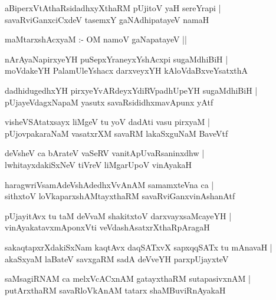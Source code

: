 \documentclass[twoside,12pt,openright]{book}
\newcounter{shloka}[chapter]
\begin{document}
\begin{shloka}%
aBiperxVtAthaRsidadhxyXthaRM pUjitoV yaH sereYrapi |\\
savaRviGanxciCxdeV tasemxY gaNAdhipatayeV namaH 
\end{shloka}

\begin{center}
maMtarxshAcxyaM :- OM namoV gaNapatayeV ||
\end{center}

\begin{shloka}%
nArAyaNapirxyeYH puSepxYraneyxYshAcxpi sugaMdhiBiH |\\
moVdakeYH PalamUleYshacx darxveyxYH kAloVdaBxveYsatxthA 
\end{shloka}

\begin{shloka}%
dadhidugedhxYH pirxyeYvARdeyxYdiRVpadhUpeYH sugaMdhiBiH |\\
pUjayeVdagxNapaM yasutx savaRsididhxmavApunx yAtf 
\end{shloka}

\begin{shloka}%
visheVSAtatxsayx liMgeV tu yoV dadAti vasu pirxyaM |\\
pUjovpakaraNaM vasatxrXM savaRM lakaSxguNaM BaveVtf
\end{shloka}

\begin{shloka}%
deVsheV ca bArateV vaSeRV vanitApUvaRsaninxdhw |\\
lwhitayxdakiSxNeV tiVreV liMgarUpoV vinAyakaH 
\end{shloka}

\begin{shloka}%
haragwriVsamAdeVshAdedhxVvAnAM samamxteVna ca |\\
sithxtoV loVkaparxshAMtayxthaRM savaRviGanxvinAshanAtf
\end{shloka}

\begin{shloka}%
pUjayitAvx tu taM deVvaM shakitxtoV darxvayxsaMcayeYH |\\
vinAyakatavxmAponxVti veVdashAsatxrXthaRpAragaH 
\end{shloka}

\begin{shloka}%
sakaqtapxrXdakiSxNam kaqtAvx daqSATxvX sapxqqSATx tu mAnavaH |\\
akaSxyaM laBateV savxgaRM sadA deVveYH parxpUjayxteV 
\end{shloka}

\begin{shloka}%
saMsagiRNAM ca melxVcACxnAM gatayxthaRM sutapasivxnAM |\\
putArxthaRM savaRloVkAnAM tatarx shaMBuviRnAyakaH 
\end{shloka}
\end{document}
